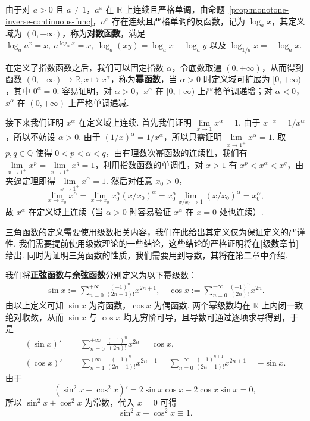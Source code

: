 \documentclass[../main.tex]{subfiles}
\begin{document}
由于对 $a > 0$ 且 $a \neq 1$，$a^x$ 在 $\mathbb R$ 上连续且严格单调，由命题~\ref{prop:monotone-inverse-continuous-func}，$a^x$ 存在连续且严格单调的反函数，记为 $\log_a x$，其定义域为 $(0, +\infty)$，称为\textbf{对数函数}，满足 $\log_a a^x = x,\ a^{\log_a x} =  x,\ \log_a (xy) = \log_a x + \log_a y$ 以及 $\log_{1 / a} x = -\log_a x$. 

在定义了指数函数之后，我们可以固定指数 $\alpha$，令底数取遍 $(0, +\infty)$，从而得到函数 $(0, +\infty) \to \mathbb R, x \mapsto x^\alpha$，称为\textbf{幂函数}，当 $\alpha > 0$ 时定义域可扩展为 $[0, +\infty)$，其中 $0^\alpha = 0$. 容易证明，对 $\alpha > 0$，$x^\alpha$ 在 $[0, +\infty)$ 上严格单调递增；对 $\alpha < 0$，$x^\alpha$ 在 $(0, +\infty)$ 上严格单调递减. 

接下来我们证明 $x^\alpha$ 在定义域上连续. 首先我们证明 $\lim\limits_{x \to 1} x^\alpha = 1$. 由于 $x^{-\alpha} = 1 / x^\alpha$，所以不妨设 $\alpha > 0$. 由于 $(1 / x)^\alpha = 1 / x^\alpha$，所以只需证明 $\lim\limits_{x \to 1^+} x^\alpha = 1$. 取 $p, q \in \mathbb Q$ 使得 $0 < p < \alpha < q$，由有理数次幂函数的连续性，我们有 $\lim\limits_{x \to 1^+} x^p = \lim\limits_{x \to 1^+} x^q = 1$，利用指数函数的单调性，对 $x > 1$ 有 $x^p < x^\alpha < x^q$，由夹逼定理即得 $\lim\limits_{x \to 1^+} x^\alpha = 1$. 然后对任意 $x_0 > 0$，
$$
\lim\limits_{x \to x_0} x^\alpha = \lim\limits_{x \to x_0} x_0^\alpha (x / x_0)^\alpha = x_0^\alpha \lim\limits_{x / x_0 \to 1} (x / x_0)^\alpha = x_0^\alpha, 
$$
故 $x^\alpha$ 在定义域上连续（当 $\alpha > 0$ 时容易验证 $x^\alpha$ 在 $x = 0$ 处也连续）.  


三角函数的定义需要使用级数相关内容，我们在此给出其定义仅为保证定义的严谨性. 我们需要提前使用级数理论的一些结论，这些结论的严格证明将在{\color{red}[级数章节]}给出. 同时为证明三角函数的性质，我们需要用到导数，其将在第二章中介绍. 

我们将\textbf{正弦函数}与\textbf{余弦函数}分别定义为以下幂级数：
\begin{align*}
    \sin x := \sum\limits_{n = 0}^{+\infty} \frac{(-1)^n}{(2n + 1)!} x^{2n + 1},\quad \cos x := \sum\limits_{n = 0}^{+\infty} \frac{(-1)^n}{(2n)!} x^{2n}. 
\end{align*}
由以上定义可知 $\sin x$ 为奇函数，$\cos x$ 为偶函数. 两个幂级数均在 $\mathbb R$ 上内闭一致绝对收敛，从而 $\sin x$ 与 $\cos x$ 均无穷阶可导，且导数可通过逐项求导得到，于是
\begin{align*}
    (\sin x)' &= \sum\limits_{n = 0}^{+\infty} \frac{(-1)^n}{(2n)!} x^{2n} = \cos x, \\
    (\cos x)' &= \sum\limits_{n = 1}^{+\infty} \frac{(-1)^n}{(2n - 1)!} x^{2n - 1} = \sum\limits_{n = 0}^{+\infty} \frac{(-1)^{n + 1}}{(2n + 1)!} x^{2n + 1} = -\sin x. 
\end{align*}
由于 
$$
(\sin^2 x + \cos^2 x)' = 2\sin x \cos x - 2 \cos x \sin x = 0, 
$$
所以 $\sin^2 x + \cos^2 x$ 为常数，代入 $x = 0$ 可得 
$$
\sin^2 x + \cos^2 x \equiv 1. 
$$
\end{document}
